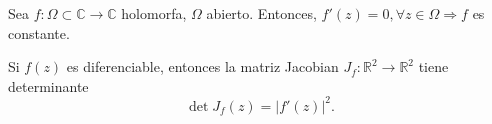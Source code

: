 \begin{cor}
  Sea $f: \Omega \subset \mathbb{C} \to \mathbb{C}$ holomorfa, $\Omega$ abierto. Entonces, $f'(z) = 0, \forall z \in \Omega \Rightarrow f$ es constante.
\end{cor}

\begin{theo}
  Si $f(z)$ es diferenciable, entonces la matriz Jacobian $J_{f}: \mathbb{R}^{2} \to \mathbb{R}^{2}$ tiene determinante
  \[ 
    \det J_{f}(z) = | f'(z) |^{2} .
  \] 
\end{theo}
